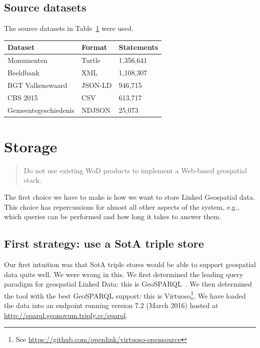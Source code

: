 \documentclass[a4paper]{scrartcl}
\newcommand{\seeUrl}[1]{\footnote{See \mbox{\url{#1}}}}
\begin{document}
\subsection{Source datasets}
\label{sec:source_datasets}

The source datasets in Table~\ref{tab:source_datasets} were used.

\begin{table}
  \centering
  \begin{tabular}{|l|l|l|}
    \hline
    \textbf{Dataset} & \textbf{Format} & \textbf{Statements}\\
    \hline
    \hline
    Monumenten & Turtle & 1,356,641\\
    \hline
    Beeldbank & XML & 1,108,307\\
    \hline
    BGT Valkenswaard & JSON-LD & 946,715\\
    \hline
    CBS 2015 & CSV & 613,717\\
    \hline
    Gemeentegeschiedenis & NDJSON & 25,073\\
    \hline
  \end{tabular}
  \label{tab:source_datasets}
\end{table}



\section{Storage}
\label{sec:storage}

\begin{quote}
  Do not use existing WoD products to implement a Web-based geospatial
  stack.
\end{quote}

The first choice we have to make is how we want to store Linked
Geospatial data.  This choice has repercussions for almost all other
aspects of the system, e.g., which queries can be performed and how
long it takes to answer them.


\subsection{First strategy: use a SotA triple store}

Our first intuition was that SotA triple stores would be able to
support geospatial data quite well.  We were wrong in this.  We first
determined the leading query paradigm for geospatial Linked Data: this
is GeoSPARQL~\cite{Battle2011}.  We then determined the tool with the
best GeoSPARQL support: this is
Virtuoso\seeUrl{https://github.com/openlink/virtuoso-opensource}.  We
  have loaded the data into an endpoint running version 7.2 (March
  2016) hosted at \url{http://sparql.geonovum.triply.cc/sparql}.
\end{document}
